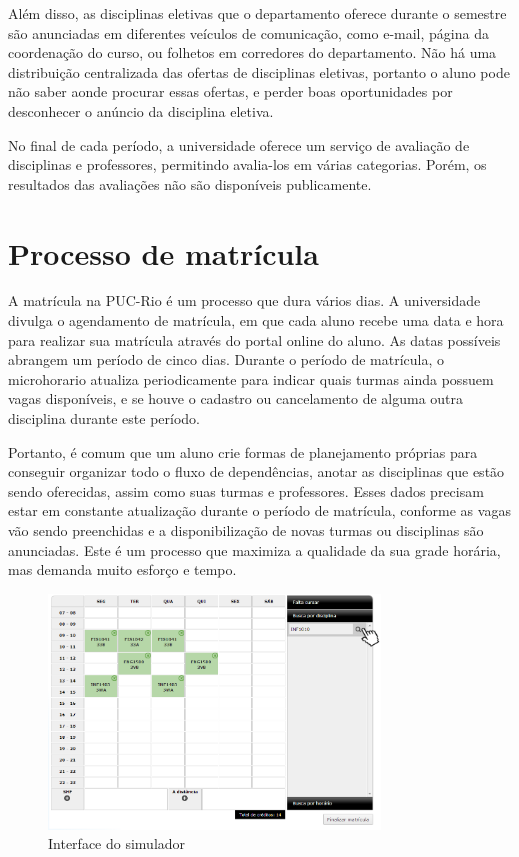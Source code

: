 Além disso, as disciplinas eletivas que o departamento oferece durante o semestre são anunciadas em diferentes veículos de comunicação, como e-mail, página da coordenação do curso, ou folhetos em corredores do departamento. Não há uma distribuição centralizada das ofertas de disciplinas eletivas, portanto o aluno pode não saber aonde procurar essas ofertas, e perder boas oportunidades por desconhecer o anúncio da disciplina eletiva.

No final de cada período, a universidade oferece um serviço de avaliação de disciplinas e professores, permitindo avalia-los em várias categorias. Porém, os resultados das avaliações não são disponíveis publicamente.

\section{Processo de matrícula}

A matrícula na PUC-Rio é um processo que dura vários dias. A universidade divulga o agendamento de matrícula, em que cada aluno recebe uma data e hora para realizar sua matrícula através do portal online do aluno. As datas possíveis abrangem um período de cinco dias. Durante o período de matrícula, o microhorario atualiza periodicamente para indicar quais turmas ainda possuem vagas disponíveis, e se houve o cadastro ou cancelamento de alguma outra disciplina durante este período.

Portanto, é comum que um aluno crie formas de planejamento próprias para conseguir organizar todo o fluxo de dependências, anotar as disciplinas que estão sendo oferecidas, assim como suas turmas e professores. Esses dados precisam estar em constante atualização durante o período de matrícula, conforme as vagas vão sendo preenchidas e a disponibilização de novas turmas ou disciplinas são anunciadas. Este é um processo que maximiza a qualidade da sua grade horária, mas demanda muito esforço e tempo. 

\begin{figure}[h]
  \begin{center}
  \includegraphics[width=250pt]{figuras/simulador}
  \caption{Interface do simulador}
  \label{fig:simulador}
  \end{center}
\end{figure}

